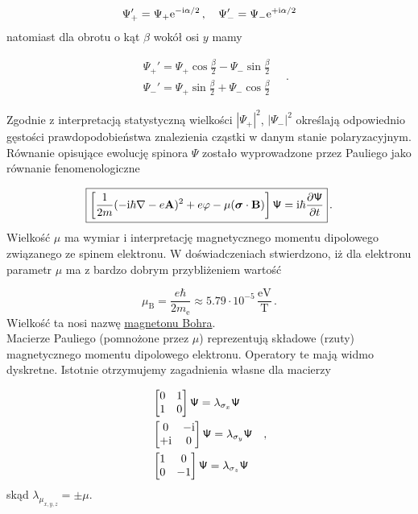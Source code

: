 \documentclass{myclass}
\begin{document}
\begin{equation*}
    \Psi_+' = \Psi_+\mathrm{e}^{-\mathrm{i}\alpha/2}\,,\quad \Psi_-' = \Psi_-\mathrm{e}^{+\mathrm{i}\alpha/2}
\end{equation*}
natomiast dla obrotu o kąt \(\beta\) wokół osi \(y\) mamy

\begin{equation*}
    \begin{split}
        &\Psi_+' = \Psi_+\cos\frac{\beta}{2} - \Psi_-\sin\frac{\beta}{2}\\
        &\Psi_-' = \Psi_+\sin\frac{\beta}{2} + \Psi_-\cos\frac{\beta}{2}        
    \end{split}\quad.
\end{equation*}

Zgodnie z interpretacją statystyczną wielkości \(|\Psi_+|^2\), \(|\Psi_-|^2\) określają odpowiednio
gęstości prawdopodobieństwa znalezienia cząstki w danym stanie polaryzacyjnym. Równanie opisujące
ewolucję spinora \(\mathsf{\Psi}\) zostało wyprowadzone przez Pauliego jako równanie
fenomenologiczne

\begin{equation*}
\boxed{\left[\frac{1}{2m}(-\mathrm{i}\hbar\nabla-e\mathbf{A})^2+e\varphi-\mu(\boldsymbol{\sigma}\cdot\mathbf{B})\right]\mathsf{\Psi}=\mathrm{i}\hbar\pdv{\mathsf{\Psi}}{t}}\,.
\end{equation*}
Wielkość \(\mu\) ma wymiar i interpretację magnetycznego momentu dipolowego związanego ze spinem
elektronu. W doświadczeniach stwierdzono, iż dla elektronu parametr \(\mu\) ma z bardzo dobrym
przybliżeniem wartość

\begin{equation*}
\mu_\text{B}=\frac{e\hbar}{2m_\text{e}}\approx 5.79\cdot10^{-5}\,\frac{\text{eV}}{\text{T}}\,.
\end{equation*}
Wielkość ta nosi nazwę \underline{magnetonu Bohra}.\\

Macierze Pauliego (pomnożone przez \(\mu\)) reprezentują składowe (rzuty) magnetycznego momentu
dipolowego elektronu. Operatory te mają widmo dyskretne. Istotnie otrzymujemy zagadnienia własne dla
macierzy

\begin{equation*}
\begin{split}
&\begin{bmatrix}
0 & 1\\
1 & 0
\end{bmatrix}\mathsf{\Psi}=\lambda_{\sigma_x}\mathsf{\Psi}\\
&\begin{bmatrix}
0 & -\mathrm{i}\\
+\mathrm{i} & 0
\end{bmatrix}\mathsf{\Psi}=\lambda_{\sigma_y}\mathsf{\Psi}\\
&\begin{bmatrix}
1 & 0\\
0 & -1
\end{bmatrix}\mathsf{\Psi}=\lambda_{\sigma_z}\mathsf{\Psi}
\end{split}\quad,
\end{equation*}
skąd \(\lambda_{\mu_{x,y,z}}=\pm \mu\).
\end{document}
